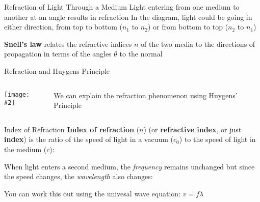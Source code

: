 \documentclass[compress,aspectratio=169]{beamer}
\newcommand{\pic}[2]{\texttt{[image: \#2]}}
\newcommand{\eq}[2]{\vspace{#1}{\LARGE\begin{displaymath}#2\end{displaymath}}}
\begin{document}
\begin{frame}{Refraction of Light Through a Medium}
  Light entering from one medium to another at an angle results in refraction
  In the diagram, light could be going in either direction, from top to bottom
  ($n_1$ to $n_2$) or from bottom to top ($n_2$ to $n_1$)
  \begin{center}
    \vspace{-.2in}
  \end{center}
  \textbf{Snell's law} relates the refractive indices $n$ of the two media
  to the directions of propagation in terms of the angles $\theta$ to the
  normal

  \eq{-.2in}{
    \boxed{n_1\sin\theta_1=n_2\sin\theta_2}
  }
\end{frame}



\begin{frame}{Refraction and Huygens Principle}
  \begin{columns}
    \pic{1}{graphics/huygen.png}
    
    We can explain the refraction phenomenon using Huygens' Principle
  \end{columns}
\end{frame}



\begin{frame}{Index of Refraction}
  \textbf{Index of refraction} ($n$) (or \textbf{refractive index}, or just
  \textbf{index}) is the ratio of the speed of light in a vacuum ($c_0$) to the
  speed of light in the medium ($c$):

  \eq{-.2in}{
    \boxed{n=\frac{c_0}{c}=\frac{\lambda_\mathrm{vacuum}}{\lambda}}
  }

  When light enters a second medium, the \emph{frequency} remains unchanged but
  since the speed changes, the \emph{wavelength} also changes:
    
  \eq{-.2in}{
    \boxed{\frac{n_1}{n_2}=\frac{\lambda_2}{\lambda_1}}
  }

  You can work this out using the univesal wave equation: $v=f\lambda$
\end{frame}
\end{document}
